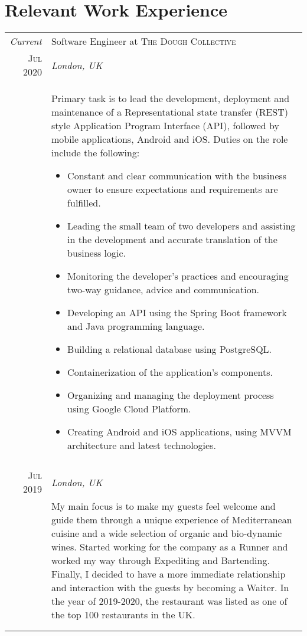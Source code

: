 \documentclass[a4paper,10pt]{article}
\begin{document}
\section{Relevant Work Experience}
\begin{tabular}{r|p{11cm}}
\emph{Current} & Software Engineer at \textsc{The Dough Collective}\\\textsc{Jul 2020} &\emph{London, UK} \\& \small{Primary task is to lead the development, deployment and maintenance of a Representational state transfer (REST) style Application Program Interface (API), followed by mobile applications, Android and iOS. Duties on the role include the following: 
\begin{itemize}
    \item Constant and clear communication with the business owner to ensure expectations and requirements are fulfilled.
    \item Leading the small team of two developers and assisting in the development and accurate translation of the business logic.
    \item Monitoring the developer's practices and encouraging two-way guidance, advice and communication.
    \item Developing an API using the Spring Boot framework and Java programming language.
    \item Building a relational database using PostgreSQL.
    \item Containerization of the application's components.
    \item Organizing and managing the deployment process using Google Cloud Platform.
    \item Creating Android and iOS applications, using MVVM architecture and latest technologies.
\end{itemize}} \\\multicolumn{2}{c}{}
\begin{comment}
\emph{Current} & Waiter at \textsc{ROVI}, Ottolenghi Ltd\hfill \textit{Full-time} \\\textsc{Jul 2019} &\emph{London, UK}\\&\footnotesize{My main focus is to make my guests feel welcome and guide them through a unique experience of Mediterranean cuisine and a wide selection of organic and bio-dynamic wines. Started working for the company as a Runner and worked my way through Expediting and Bartending. Finally, I decided to have a more immediate relationship and interaction with the guests by becoming a Waiter. In the year of 2019-2020, the restaurant was listed as one of the top 100 restaurants in the UK.}\\\multicolumn{2}{c}{} \\

\end{comment}
\end{tabular}
\end{document}
